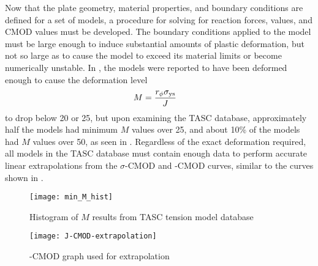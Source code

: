 Now that the plate geometry, material properties, and boundary conditions are defined for a set of models, a procedure for solving for reaction forces, \J values, and CMOD values must be developed.
The boundary conditions applied to the model must be large enough to induce substantial amounts of plastic deformation, but not so large as to cause the model to exceed its material limits or become numerically unstable.
In \cite{allenwells2014}, the models were reported to have been deformed enough to cause the deformation level
\begin{align}
M &= \frac{r_{\phi} \sigma_{\textnormal{ys}}}{J}
\end{align}
to drop below 20 or 25, but upon examining the TASC database, approximately half the models had minimum \(M\) values over 25, and about 10\% of the models had \(M\) values over 50, as seen in .
Regardless of the exact deformation required, all models in the TASC database must contain enough data to perform accurate linear extrapolations from the \(\sigma\)-CMOD and \J-CMOD curves, similar to the curves shown in .

\begin{figure}[tbp]
\centering
\texttt{[image: min\_M\_hist]}
\caption{\label{fig:min-M-hist} Histogram of \(M\) results from TASC tension model database}
\end{figure}

\begin{figure}[tbp]
\centering
\texttt{[image: J-CMOD-extrapolation]}
\caption[\J-CMOD graph used for extrapolation]{\label{fig:J-CMOD-extrapolation} \J-CMOD graph used for extrapolation \cite{allenwells2014}}
\end{figure}

